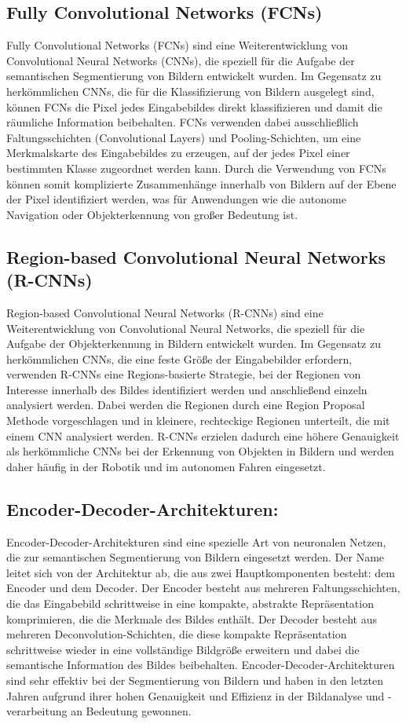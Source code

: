 \subsection{Fully Convolutional Networks (FCNs)}
Fully Convolutional Networks (FCNs) sind eine Weiterentwicklung von
Convolutional Neural Networks (CNNs), die speziell für die Aufgabe der
semantischen Segmentierung von Bildern entwickelt wurden. Im Gegensatz zu
herkömmlichen CNNs, die für die Klassifizierung von Bildern ausgelegt sind,
können FCNs die Pixel jedes Eingabebildes direkt klassifizieren und damit die
räumliche Information beibehalten. FCNs verwenden dabei ausschließlich
Faltungsschichten (Convolutional Layers) und Pooling-Schichten, um eine
Merkmalskarte des Eingabebildes zu erzeugen, auf der jedes Pixel einer
bestimmten Klasse zugeordnet werden kann. Durch die Verwendung von FCNs können
somit komplizierte Zusammenhänge innerhalb von Bildern auf der Ebene der Pixel
identifiziert werden, was für Anwendungen wie die autonome Navigation oder
Objekterkennung von großer Bedeutung ist.
\subsection{Region-based Convolutional Neural Networks (R-CNNs)}
Region-based Convolutional Neural Networks (R-CNNs) sind eine Weiterentwicklung
von Convolutional Neural Networks, die speziell für die Aufgabe der
Objekterkennung in Bildern entwickelt wurden. Im Gegensatz zu herkömmlichen
CNNs, die eine feste Größe der Eingabebilder erfordern, verwenden R-CNNs eine
Regions-basierte Strategie, bei der Regionen von Interesse innerhalb des Bildes
identifiziert werden und anschließend einzeln analysiert werden. Dabei werden
die Regionen durch eine Region Proposal Methode vorgeschlagen und in kleinere,
rechteckige Regionen unterteilt, die mit einem CNN analysiert werden. R-CNNs
erzielen dadurch eine höhere Genauigkeit als herkömmliche CNNs bei der
Erkennung von Objekten in Bildern und werden daher häufig in der Robotik und im
autonomen Fahren eingesetzt.
\subsection{Encoder-Decoder-Architekturen:}

Encoder-Decoder-Architekturen sind eine spezielle Art von neuronalen Netzen,
die zur semantischen Segmentierung von Bildern eingesetzt werden. Der Name
leitet sich von der Architektur ab, die aus zwei Hauptkomponenten besteht: dem
Encoder und dem Decoder. Der Encoder besteht aus mehreren Faltungsschichten,
die das Eingabebild schrittweise in eine kompakte, abstrakte Repräsentation
komprimieren, die die Merkmale des Bildes enthält. Der Decoder besteht aus
mehreren Deconvolution-Schichten, die diese kompakte Repräsentation
schrittweise wieder in eine vollständige Bildgröße erweitern und dabei die
semantische Information des Bildes beibehalten. Encoder-Decoder-Architekturen
sind sehr effektiv bei der Segmentierung von Bildern und haben in den letzten
Jahren aufgrund ihrer hohen Genauigkeit und Effizienz in der Bildanalyse und
-verarbeitung an Bedeutung gewonnen.
